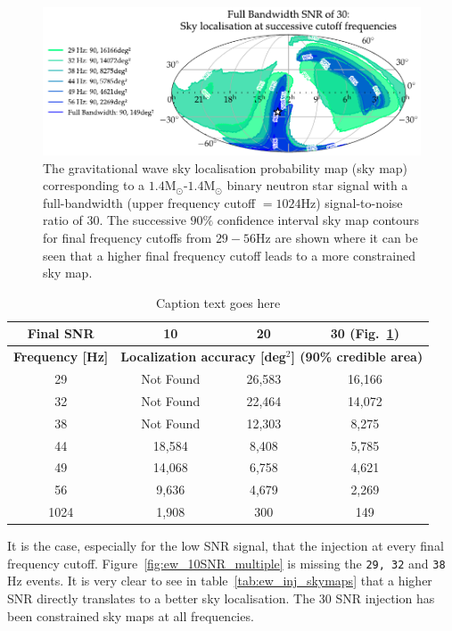 \begin{figure}
    \centering
    \includegraphics[width=\textwidth]{images/6_earlywarning/localisation/30SNR_multiple.pdf}
    \caption{The gravitational wave sky localisation probability map (sky map) corresponding to a $1.4$M$_{\odot}$-$1.4$M$_{\odot}$ binary neutron star signal with a full-bandwidth (upper frequency cutoff $= 1024$Hz) signal-to-noise ratio of $30$. The successive $90\%$ confidence interval sky map contours for final frequency cutoffs from $29-56$Hz are shown where it can be seen that a higher final frequency cutoff leads to a more constrained sky map.}
    \label{6:fig:ew_30SNR_multiple}
\end{figure}
%
\begin{table}[ht]
    \centering
    \setlength{\tabcolsep}{4pt}
    \begin{tabular}{cccc}
        \toprule
        \textbf{Final SNR} & \textbf{10} & \textbf{20} & \textbf{30 (Fig.~\ref{6:fig:ew_30SNR_multiple})} \\
        \midrule
        \textbf{Frequency [Hz]} & \multicolumn{3}{c}{\textbf{Localization accuracy [deg$^{2}$] (90\% credible area) }} \\
        \cmidrule(lr){2-4}
        29 & Not Found & 26,583 & 16,166 \\
        32 & Not Found & 22,464 & 14,072 \\
        38 & Not Found & 12,303 & 8,275 \\
        44 & 18,584 & 8,408 & 5,785 \\
        49 & 14,068 & 6,758 & 4,621 \\
        56 & 9,636 & 4,679 & 2,269 \\
        1024 & 1,908 & 300 & 149 \\
        \bottomrule
    \end{tabular}
    \caption{Caption text goes here}
    \label{6:tab:gw170817_early_warning}
\end{table}
%
It is the case, especially for the low SNR signal, that the injection at every final frequency cutoff. Figure~\ref{fig:ew_10SNR_multiple} is missing the \verb|29, 32| and \verb|38| Hz events. It is very clear to see in table~\ref{tab:ew_inj_skymaps} that a higher SNR directly translates to a better sky localisation. The 30 SNR injection has been constrained sky maps at all frequencies.

